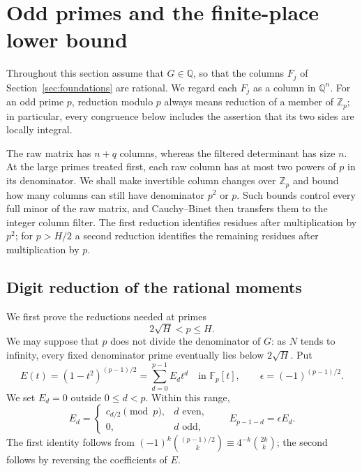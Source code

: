 \section{Odd primes and the finite-place lower bound}
\label{sec:odd-primes}

Throughout this section assume that $G\in\mathbb Q$, so that the columns
$F_j$ of Section~\ref{sec:foundations} are rational.  We regard each $F_j$
as a column in $\mathbb Q^n$.  For an odd prime $p$, reduction modulo $p$
always means reduction of a member of $\mathbb Z_p$; in particular, every
congruence below includes the assertion that its two sides are locally
integral.

The raw matrix has $n+q$ columns, whereas the filtered determinant has
size $n$.  At the large primes treated first, each raw column has at most
two powers of $p$ in its denominator.  We shall make invertible column
changes over $\mathbb Z_p$ and bound how many columns can still have
denominator $p^2$ or $p$.  Such bounds control every full minor of the
raw matrix, and Cauchy--Binet \cite{Binet1813,Cauchy1815} then transfers them to the integer column
filter.  The first reduction identifies residues after multiplication
by $p^2$; for $p>H/2$ a second reduction identifies the remaining
residues after multiplication by $p$.

\subsection{Digit reduction of the rational moments}

We first prove the reductions needed at primes
\[
  2\sqrt H<p\le H.
\]
We may suppose that $p$ does not divide the denominator of $G$: as $N$
tends to infinity, every fixed denominator prime eventually lies below
$2\sqrt H$.  Put
\[
 E(t)=(1-t^2)^{(p-1)/2}=\sum_{d=0}^{p-1}E_dt^d
 \quad\text{in }\mathbb F_p[t],\qquad
 \epsilon=(-1)^{(p-1)/2}.
\]
We set $E_d=0$ outside $0\le d<p$.  Within this range,
\[
 E_d=\begin{cases}c_{d/2}\pmod p,&d\text{ even},\\0,&d\text{ odd},\end{cases}
 \qquad E_{p-1-d}=\epsilon E_d.
\]
The first identity follows from
$(-1)^k\binom{(p-1)/2}{k}\equiv4^{-k}\binom{2k}{k}$; the second follows
by reversing the coefficients of $E$.

